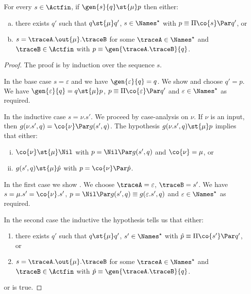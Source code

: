 \begin{lemma}%
  \label{lem:inversion-gen-accs-mu}
  For every $s \in \Actfin$,
  if $\gen{s}{q} \st{ \mu } p$
  then either:
  \begin{enumerate}[(a)]
  \item\label{pt:inversion-gen-accs-mu-left}
    there exists $q'$ such that $q \st{\mu} q'$, $s \in \Names^\star$ with $p \equiv \Pi \co{s} \Par q'$, or
  \item\label{pt:inversion-gen-accs-mu-right}
    $s = \traceA. \out{\mu}. \traceB$ for some $\traceA \in \Names^{\star}$ and $\traceB \in \Actfin$
    with $p \equiv \gen{\traceA.\traceB}{q}$.
  \end{enumerate}
\end{lemma}
\begin{proof}
The proof is by induction over the sequence $s$.

In the base case $s = \varepsilon$ and we have $\gen{\varepsilon}{q} = q$.
We show  and choose $q' = p$.
We have $\gen{\varepsilon}{q} = q \st{\mu} p$,
$p \equiv \Pi \co{\varepsilon} \Par q'$ and $\varepsilon \in \Names^\star$
as required.

In the inductive case $s = \nu.s'$.
We proceed by case-analysis on $\nu$.
If $\nu$ is an input, then $g (\nu.s', q) = \co{\nu} \Par g (s', q)$.
The hypothesis $g (\nu.s', q) \st{\mu} p$ implies that either:
\begin{enumerate}[(i)]
\item $\co{\nu} \st{\mu} \Nil$ with $p = \Nil \Par g (s', q)$ and $\co{\nu} = \mu$, or
\item $g (s', q) \st{\mu} \hat{p}$ with $p = \co{\nu} \Par \hat{p}$.
\end{enumerate}

In the first case we show .
We choose $\traceA = \varepsilon$, $\traceB = s'$.
We have $s = \mu.s' = \co{\nu}.s'$, $p = \Nil \Par g (s', q) \equiv g (\varepsilon.s', q)$
and $\varepsilon \in \Names^\star$ as required.

In the second case the inductive the hypothesis tells us that either:
\begin{enumerate}[(H-a)]
\item\label{pt:inversion-gen-accs-mu-left-IH}
  there exists $q'$ such that $q \st{\mu} q'$, $s' \in \Names^\star$
  with $\hat{p} \equiv \Pi \co{s'} \Par q'$, or
\item\label{pt:inversion-gen-accs-mu-right-IH}
  $s = \traceA. \out{\mu}. \traceB$ for some $\traceA \in \Names^{\star}$ and $\traceB \in \Actfin$
  with $\hat{p} \equiv \gen{\traceA.\traceB}{q}$.
\end{enumerate}
 or  is true.


\end{proof}
